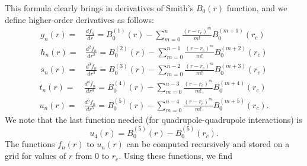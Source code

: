 This formula clearly brings in derivatives of Smith's $B_0(r)$
function, and we define higher-order derivatives as follows:
\begin{align}
g_n(r)=& \frac{d f_n}{d r} =
B_0^{(1)}(r) -\sum_{m=0}^{n} \frac {(r-r_c)^m}{m!} B_0^{(m+1)}(r_c) \\
h_n(r)=& \frac{d^2f_n}{d r^2} =
B_0^{(2)}(r) -\sum_{m=0}^{n-1} \frac {(r-r_c)^m}{m!} B_0^{(m+2)}(r_c) \\
s_n(r)=& \frac{d^3f_n}{d r^3} =
B_0^{(3)}(r) -\sum_{m=0}^{n-2} \frac {(r-r_c)^m}{m!} B_0^{(m+3)}(r_c) \end{align}
\begin{align}
t_n(r)=& \frac{d^4f_n}{d r^4} =
B_0^{(4)}(r) -\sum_{m=0}^{n-3} \frac {(r-r_c)^m}{m!} B_0^{(m+4)}(r_c) \\
u_n(r)=& \frac{d^5f_n}{d r^5} =
B_0^{(5)}(r) -\sum_{m=0}^{n-4} \frac {(r-r_c)^m}{m!} B_0^{(m+5)}(r_c)  .
\end{align}
We note that the last function needed (for quadrupole-quadrupole interactions) is
%
\begin{equation}
u_4(r)=B_0^{(5)}(r) - B_0^{(5)}(r_c) .
\end{equation}
The functions $f_n(r)$ to $u_n(r)$ can be computed recursively and
stored on a grid for values of $r$ from $0$ to $r_c$.  Using these
functions, we find
%
